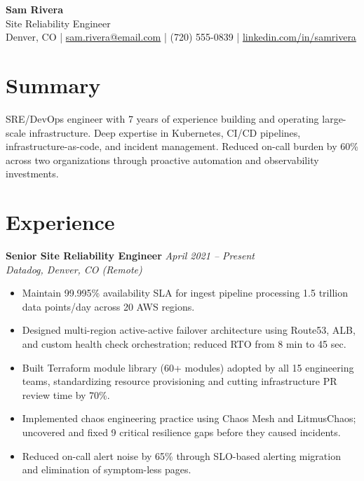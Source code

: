 \documentclass[11pt,a4paper]{article}
\begin{document}
\begin{center}
  {\LARGE \textbf{Sam Rivera}}\\[3pt]
  {\large Site Reliability Engineer}\\[4pt]
  Denver, CO \quad|\quad
  \href{mailto:sam.rivera@email.com}{sam.rivera@email.com} \quad|\quad
  (720) 555-0839 \quad|\quad
  \href{https://linkedin.com/in/samrivera}{linkedin.com/in/samrivera}
\end{center}

\section{Summary}
SRE/DevOps engineer with 7 years of experience building and operating large-scale infrastructure. Deep expertise in Kubernetes, CI/CD pipelines, infrastructure-as-code, and incident management. Reduced on-call burden by 60\% across two organizations through proactive automation and observability investments.

\section{Experience}

\noindent\textbf{Senior Site Reliability Engineer} \hfill \textit{April 2021 -- Present}\\
\textit{Datadog, Denver, CO (Remote)}
\begin{itemize}
  \item Maintain 99.995\% availability SLA for ingest pipeline processing 1.5 trillion data points/day across 20 AWS regions.
  \item Designed multi-region active-active failover architecture using Route53, ALB, and custom health check orchestration; reduced RTO from 8 min to 45 sec.
  \item Built Terraform module library (60+ modules) adopted by all 15 engineering teams, standardizing resource provisioning and cutting infrastructure PR review time by 70\%.
  \item Implemented chaos engineering practice using Chaos Mesh and LitmusChaos; uncovered and fixed 9 critical resilience gaps before they caused incidents.
  \item Reduced on-call alert noise by 65\% through SLO-based alerting migration and elimination of symptom-less pages.
\end{itemize}
\end{document}
